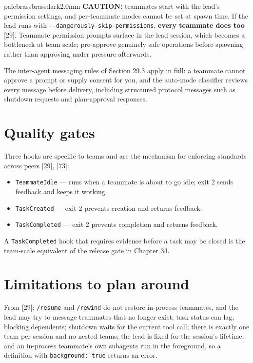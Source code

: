 \documentclass[11pt,a4paper,twoside,openany]{book}
\begin{document}
\begin{calloutbox}{palebrass}{brassdark}{2.0mm}
\textbf{CAUTION:} teammates start with the lead's permission settings, and per-teammate modes cannot be set at spawn time. If the lead runs with \texttt{-\allowbreak{}-\allowbreak{}dangerously-\allowbreak{}skip-\allowbreak{}permissions}, \textbf{every teammate does too} [29]. Teammate permission prompts surface in the lead session, which becomes a bottleneck at team scale; pre-approve genuinely safe operations before spawning rather than approving under pressure afterwards.
\end{calloutbox}

The inter-agent messaging rules of Section 29.3 apply in full: a teammate cannot approve a prompt or supply consent for you, and the auto-mode classifier reviews every message before delivery, including structured protocol messages such as shutdown requests and plan-approval responses.


\FloatBarrier
\setcounter{section}{4}
\section{Quality gates}

Three hooks are specific to teams and are the mechanism for enforcing standards across peers [29], [73]:


\begin{itemize}
\item \texttt{Teammate\allowbreak{}Idle} — runs when a teammate is about to go idle; exit 2 sends feedback and keeps it working.
\item \texttt{Task\allowbreak{}Created} — exit 2 prevents creation and returns feedback.
\item \texttt{Task\allowbreak{}Completed} — exit 2 prevents completion and returns feedback.
\end{itemize}

A \texttt{Task\allowbreak{}Completed} hook that requires evidence before a task may be closed is the team-scale equivalent of the release gate in Chapter 34.


\FloatBarrier
\setcounter{section}{5}
\section{Limitations to plan around}

From [29]: \texttt{/\allowbreak{}resume} and \texttt{/\allowbreak{}rewind} do not restore in-process teammates, and the lead may try to message teammates that no longer exist; task status can lag, blocking dependents; shutdown waits for the current tool call; there is exactly one team per session and no nested teams; the lead is fixed for the session's lifetime; and an in-process teammate's own subagents run in the foreground, so a definition with \texttt{background:\allowbreak{} true} returns an error.
\end{document}
